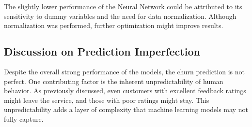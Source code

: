 \documentclass[12pt,titlepage]{article}
\begin{document}
The slightly lower performance of the Neural Network could be attributed to its sensitivity to dummy variables and the need for data normalization. Although normalization was performed, further optimization might improve results.

\subsection{Discussion on Prediction Imperfection}
Despite the overall strong performance of the models, the churn prediction is not perfect. One contributing factor is the inherent unpredictability of human behavior. As previously discussed, even customers with excellent feedback ratings might leave the service, and those with poor ratings might stay. This unpredictability adds a layer of complexity that machine learning models may not fully capture.
\end{document}
